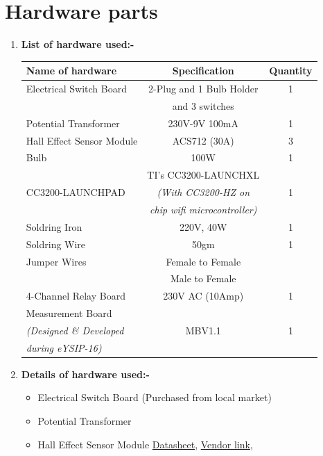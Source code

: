 \documentclass[a4paper,12pt,oneside]{book}
\begin{document}
\newpage
\section{Hardware parts}
\begin{enumerate}
  \item \textbf{List of hardware used:-}\\
  
		 \begin{tabular}{|l|c|c|}
		 	\hline
		 	\textbf{Name of hardware} & \textbf{Specification} & \textbf{Quantity} \\ \hline
		 	Electrical Switch Board& 2-Plug and 1 Bulb Holder & 1\\ 
		 	& and 3 switches&\\\hline
		 	Potential Transformer& 230V-9V 100mA &1 \\ \hline
		 	Hall Effect Sensor Module& ACS712 (30A) &3\\ \hline
		 	Bulb& 100W & 1\\ \hline
		 	& TI's CC3200-LAUNCHXL&\\
		 	CC3200-LAUNCHPAD&\textit{(With CC3200-HZ on } &1 \\
		 	&\textit{ chip wifi microcontroller)} &\\\hline
		 	Soldring Iron& 220V, 40W &1 \\ \hline
		 	Soldring Wire& 50gm & 1 \\ \hline
		 	Jumper Wires& Female to Female & \\\cline{2-3}
		 	&Male to Female& \\\hline
		 	4-Channel Relay Board& 230V AC (10Amp)& 1\\ \hline
		 	Measurement Board& & \\ 
		 	\textit{(Designed \& Developed } & MBV1.1 & 1 \\
		 	\textit{ \hspace{1cm} during eYSIP-16) } & & \\ \hline
		 \end{tabular}
		 \vspace{1cm}
	\item \textbf{Details of hardware used:-}
	\begin{itemize}
		  \item Electrical Switch Board (Purchased from local market) 
		  \item Potential Transformer 
		  \item Hall Effect Sensor Module \href{https://github.com/eYSIP-2016/eYSIP2016-GHPowerMonitoring/blob/master/Documents/report_eYSIP_GHpowerMonitoring/datasheet/ACS712-Datasheet.pdf}{Datasheet}, \href{http://www.amazon.in/Current-Sensor-Module-ACS712-model/dp/B00NU8XD80?tag=googinhydr18418-21&tag=googinkenshoo-21&ascsubtag=8a34ff38-5122-429d-8260-7633d5ca1fcf}{Vendor link},

\end{itemize}
\end{enumerate}
\end{document}
